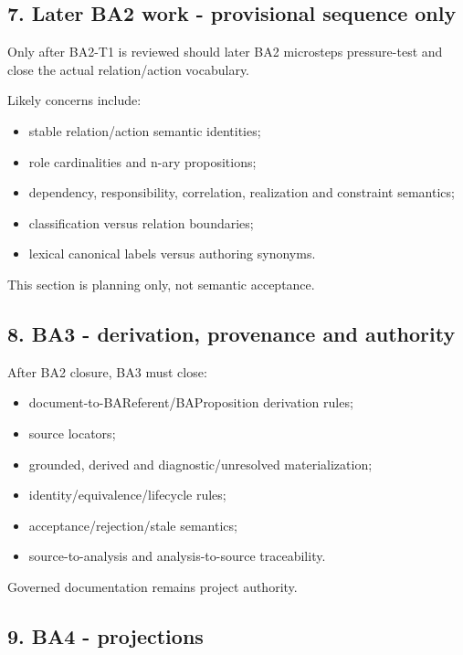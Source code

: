 \documentclass[
  10pt,
  a4paper,
]{article}
\providecommand{\tightlist}{%
  \setlength{\itemsep}{0pt}\setlength{\parskip}{0pt}}
\begin{document}
\subsection{7. Later BA2 work - provisional sequence
only}\label{later-ba2-work---provisional-sequence-only}

Only after BA2-T1 is reviewed should later BA2 microsteps pressure-test
and close the actual relation/action vocabulary.

Likely concerns include:

\begin{itemize}
\tightlist
\item
  stable relation/action semantic identities;
\item
  role cardinalities and n-ary propositions;
\item
  dependency, responsibility, correlation, realization and constraint
  semantics;
\item
  classification versus relation boundaries;
\item
  lexical canonical labels versus authoring synonyms.
\end{itemize}

This section is planning only, not semantic acceptance.

\subsection{8. BA3 - derivation, provenance and
authority}\label{ba3---derivation-provenance-and-authority}

After BA2 closure, BA3 must close:

\begin{itemize}
\tightlist
\item
  document-to-BAReferent/BAProposition derivation rules;
\item
  source locators;
\item
  grounded, derived and diagnostic/unresolved materialization;
\item
  identity/equivalence/lifecycle rules;
\item
  acceptance/rejection/stale semantics;
\item
  source-to-analysis and analysis-to-source traceability.
\end{itemize}

Governed documentation remains project authority.

\subsection{9. BA4 - projections}\label{ba4---projections}
\end{document}
